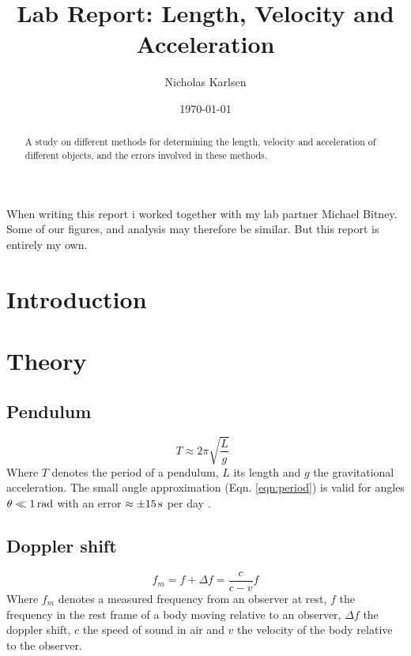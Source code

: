 \documentclass[11pt,a4paper]{article}
\begin{document}

\title{Lab Report: Length, Velocity and Acceleration}%

\author{Nicholas Karlsen}

\date{\today}%

\maketitle

When writing this report i worked together with my lab partner Michael Bitney. Some of our figures, and analysis may therefore be similar. But this report is entirely my own.

\begin{abstract}
  A study on different methods for determining the length, velocity and acceleration of different objects, and the errors involved in these methods.
\end{abstract}
\section{\label{sec:intro}Introduction}

\section{\label{sec:theory}Theory}
  \subsection{Pendulum}
    \begin{equation}
      \label{eqn:period}
        T \approx 2\pi \sqrt{\frac{L}{g}}\enspace
    \end{equation}
    Where $T$ denotes the period of a pendulum, $L$ its length and $g$ the gravitational acceleration. The small angle approximation (Eqn. \ref{eqn:period})  is valid for angles $\theta \ll 1\, \textup{rad}$ with an error $\approx \pm 15 \, \textup{s}$ per day \cite{pend_wik}.

  \subsection{Doppler shift}
    \begin{equation}
      f_m = f + \Delta f = \frac{c}{c-v}f  
      \label{eqn:doppler}
    \end{equation}
    Where $f_m$ denotes a measured frequency from an observer at rest, $f$ the frequency in the rest frame of a body moving relative to an observer, $\Delta f$ the doppler shift, $c$ the speed of sound in air and $v$ the velocity of the body relative to the observer.
\end{document}
